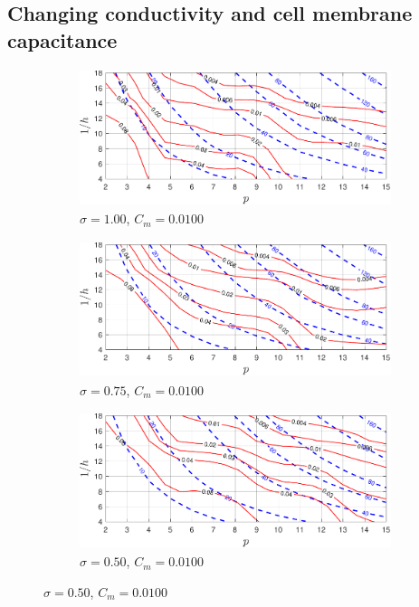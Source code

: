 \subsection{Changing conductivity and cell membrane capacitance}
\begin{figure}[ht!]
    \centering
    
    \begin{subfigure}{0.45\textwidth}
        \centering
        \includegraphics[width=\linewidth, height=4cm]{figs/cond1.00.pdf}  
        \caption{$\sigma = 1.00$, $C_m = 0.0100$}
        \label{cond1.00}
    \end{subfigure}
    \begin{subfigure}{0.45\textwidth}
        \centering
        \includegraphics[width=\linewidth, height=4cm]{figs/cond0.75.pdf} 
        \caption{$\sigma = 0.75$, $C_m = 0.0100$}
        \label{cond0.75}
    \end{subfigure}
    \begin{subfigure}{0.45\textwidth}
        \centering
        \includegraphics[width=\linewidth, height=4cm]{figs/cond0.50.pdf}  
        \caption{$\sigma = 0.50$, $C_m = 0.0100$}
        \label{cond0.50}
    \end{subfigure}

\end{figure}
